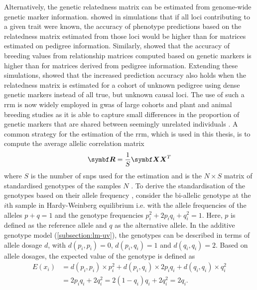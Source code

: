 Alternatively, the genetic relatedness matrix can be estimated from genome-wide genetic marker information. \citet{Nejati-Javaremi1997} showed in simulations that if all loci contributing to a given trait were known, the accuracy of phenotype predictions based on the relatedness matrix estimated from those loci would be higher than for matrices estimated on pedigree information. Similarly, \citet{Villanueva2005} showed that the accuracy of breeding values from relationship matrices computed based on genetic markers is higher than for matrices derived from pedigree information. Extending these simulations, \citet{Hayes2009} showed that the increased prediction accuracy also holds when the relatedness matrix is estimated for a cohort of unknown pedigree using dense genetic markers instead of all true, but unknown causal loci. The use of such a \gls{rrm} is now widely employed in \gls{gwas} of large cohorts and plant and animal breeding studies as it is able to capture small differences in the proportion of genetic markers that are shared between seemingly unrelated individuals \citep{Lee2010,Lopes2013}. A common strategy for the estimation of the \gls{rrm}, which is used in this thesis, is to compute the average allelic correlation matrix
%
 \begin{equation}
 \mat{R} = \frac{1}{S}\mat{XX}^T
 \label{eq:relatedness}
 \end{equation}
where \(S\) is the number of \glspl{snp} used for the estimation and  is the \(N \times S\) matrix of standardised genotypes of the samples \(N\) \citep{Patterson2006,Yang2011}. To derive the standardisation of the genotypes based on their allele frequency \citep{Patterson2006,Yang2011,Casale2015}, consider the bi-allelic genotype at the \(i\)th sample  in Hardy-Weinberg equilibrium i.e. with the allele frequencies of the alleles  \(p + q =1\) and the genotype frequencies \(p_i^2 + 2p_iq_i + q_i^2 = 1\). Here,  \(p\) is defined as the reference allele and  \(q\) as the alternative allele. In the additive genotype model (\cref{subsection:lm-uv}), the genotypes can be described in terms of allele dosage \(d\), with \(d(p_i,p_i) = 0\), \(d(p_i,q_i) = 1\) and \(d(q_i,q_i) = 2\). Based on allele dosages, the expected value of the genotype is defined as 
\begin{align}
E(x_i) &=  d(p_i,p_i) \times p_i^2 + d(p_i,q_i) \times 2p_iq_i + d(q_i,q_i) \times  q_i^2 \\
		  &= 2p_iq_i + 2q_i^2 = 2(1-q_i)q_i + 2q_i^2 = 2q_i.
\end{align}
